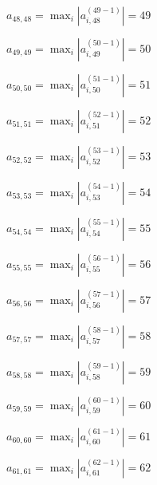 \documentclass[a4paper,12pt]{article}
\begin{document}
$a _{ 48, 48 } =  \max _i |a _{ i, 48 } ^{ (49 - 1) } | = 49$

$a _{ 49, 49 } =  \max _i |a _{ i, 49 } ^{ (50 - 1) } | = 50$

$a _{ 50, 50 } =  \max _i |a _{ i, 50 } ^{ (51 - 1) } | = 51$

$a _{ 51, 51 } =  \max _i |a _{ i, 51 } ^{ (52 - 1) } | = 52$

$a _{ 52, 52 } =  \max _i |a _{ i, 52 } ^{ (53 - 1) } | = 53$

$a _{ 53, 53 } =  \max _i |a _{ i, 53 } ^{ (54 - 1) } | = 54$

$a _{ 54, 54 } =  \max _i |a _{ i, 54 } ^{ (55 - 1) } | = 55$

$a _{ 55, 55 } =  \max _i |a _{ i, 55 } ^{ (56 - 1) } | = 56$

$a _{ 56, 56 } =  \max _i |a _{ i, 56 } ^{ (57 - 1) } | = 57$

$a _{ 57, 57 } =  \max _i |a _{ i, 57 } ^{ (58 - 1) } | = 58$

$a _{ 58, 58 } =  \max _i |a _{ i, 58 } ^{ (59 - 1) } | = 59$

$a _{ 59, 59 } =  \max _i |a _{ i, 59 } ^{ (60 - 1) } | = 60$

$a _{ 60, 60 } =  \max _i |a _{ i, 60 } ^{ (61 - 1) } | = 61$

$a _{ 61, 61 } =  \max _i |a _{ i, 61 } ^{ (62 - 1) } | = 62$
\end{document}
